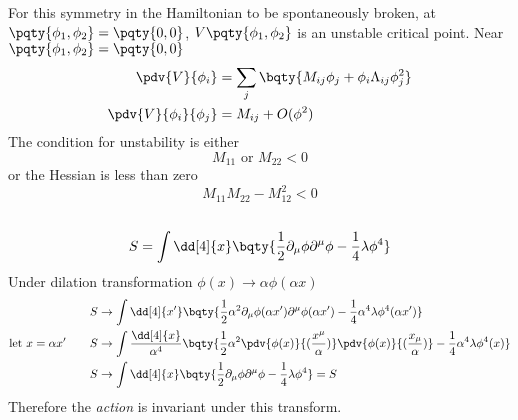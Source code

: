 \documentclass[12pt]{article}
\begin{document}
        \subsubsection{} For this symmetry in the Hamiltonian to be spontaneously broken, at \(\pqty{\phi_1,\phi_2} = \pqty{0,0}\), \(V\pqty{\phi_1,\phi_2}\) is an unstable critical point. Near \(\pqty{\phi_1,\phi_2} = \pqty{0,0}\) \begin{align*}
            \pdv{V}{\phi_i} &=  \sum_{j}\bqty{ M_{ij} \phi_j + \phi_i\Lambda_{ij}  \phi_j^2 } \\
            \pdv{V}{\phi_i}{\phi_j} &=  M_{ij} + O(\phi^2)
        \end{align*}
        The condition for unstability is either \[
            M_{11}\text{ or } M_{22} < 0
        \] or the Hessian is less than zero \[
            M_{11}M_{22} - M_{12}^2 < 0
        \]
        \subsection{} { \[
            S = \int \dd[4]{x}\bqty{\frac{1}{2}\partial_\mu \phi \partial^\mu \phi - \frac{1}{4} \lambda \phi^4}
        \]}
        Under dilation transformation \(\phi(x) \to \alpha \phi(\alpha x)\) \begin{align*}
            S & \to \int \dd[4]{ x'}\bqty{\frac{1}{2}\alpha^2 \partial_\mu \phi(\alpha x') \partial^\mu \phi(\alpha x') - \frac{1}{4} \alpha^4 \lambda \phi^4(\alpha x')}\\
            \text{let } x = \alpha x'
            \qquad S &\to \int \frac{\dd[4]{x}}{\alpha^4} \bqty{\frac{1}{2}\alpha^2 \pdv{\phi(x)}{(\frac{x^\mu}{\alpha})} \pdv{\phi(x)}{(\frac{x_\mu}{\alpha})} - \frac{1}{4} \alpha^4 \lambda \phi^4(x)}\\
            S &\to \int \dd[4]{x}\bqty{\frac{1}{2}\partial_\mu \phi \partial^\mu \phi - \frac{1}{4} \lambda \phi^4} = S
        \end{align*}
        Therefore the \emph{action} is invariant under this transform. 
\end{document}
